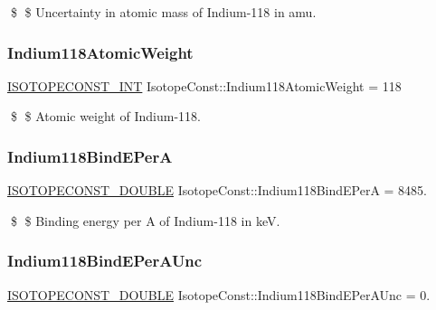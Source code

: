 \$ \$ Uncertainty in atomic mass of Indium-\/118 in amu. \mbox{\label{group___isotope_const-_indium-_in118_ga9faf4f21e6374ef602030f34885abea5}} 
\subsubsection{\texorpdfstring{Indium118\+Atomic\+Weight}{Indium118AtomicWeight}}
{\footnotesize\ttfamily \mbox{\hyperlink{group___isotope_const-_macros_ga5f18360b3e99483a35c32d789e62621c}{I\+S\+O\+T\+O\+P\+E\+C\+O\+N\+S\+T\+\_\+\+I\+NT}} Isotope\+Const\+::\+Indium118\+Atomic\+Weight = 118}

\$ \$ Atomic weight of Indium-\/118. \mbox{\label{group___isotope_const-_indium-_in118_gaed47a173084b01ebaa51cf31f64a5d7a}} 
\subsubsection{\texorpdfstring{Indium118\+Bind\+E\+PerA}{Indium118BindEPerA}}
{\footnotesize\ttfamily \mbox{\hyperlink{group___isotope_const-_macros_ga8f45a7272ce02c0b4c65c44636ed719a}{I\+S\+O\+T\+O\+P\+E\+C\+O\+N\+S\+T\+\_\+\+D\+O\+U\+B\+LE}} Isotope\+Const\+::\+Indium118\+Bind\+E\+PerA = 8485.}

\$ \$ Binding energy per A of Indium-\/118 in keV. \mbox{\label{group___isotope_const-_indium-_in118_gac67c536391d18747feaa5a9ffd9a62e7}} 
\subsubsection{\texorpdfstring{Indium118\+Bind\+E\+Per\+A\+Unc}{Indium118BindEPerAUnc}}
{\footnotesize\ttfamily \mbox{\hyperlink{group___isotope_const-_macros_ga8f45a7272ce02c0b4c65c44636ed719a}{I\+S\+O\+T\+O\+P\+E\+C\+O\+N\+S\+T\+\_\+\+D\+O\+U\+B\+LE}} Isotope\+Const\+::\+Indium118\+Bind\+E\+Per\+A\+Unc = 0.}

